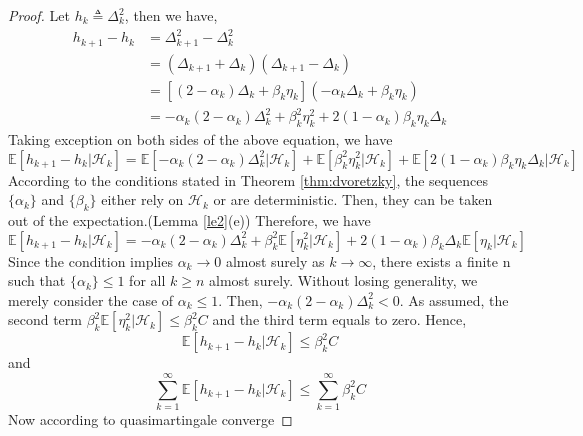   \begin{proof}
    Let $h_{k} \triangleq \Delta_{k}^{2}$, then we have,
    \begin{align*}
      h_{k+1} - h_{k} & = \Delta_{k+1}^{2} - \Delta_{k}^{2}                                                                                     \\
                      & = (\Delta_{k+1}+\Delta_{k})(\Delta_{k+1}-\Delta_{k})                                                                    \\
                      & = \left[(2-\alpha_{k}) \Delta_{k}+\beta_{k} \eta_{k}\right](-\alpha_{k} \Delta_{k}+\beta_{k} \eta_{k})                  \\
                      & = -\alpha_{k}(2-\alpha_{k}) \Delta_{k}^{2} + \beta_{k}^{2} \eta_{k}^{2} + 2(1-\alpha_{k}) \beta_{k} \eta_{k} \Delta_{k}
    \end{align*}
    Taking exception on both sides of the above equation, we have \[\mathbb{E}[h_{k+1} - h_{k}|\mathcal{H}_{k}] =
      \mathbb{E}[-\alpha_{k}(2-\alpha_{k}) \Delta_{k}^{2}|\mathcal{H}_{k}] + \mathbb{E}[\beta_{k}^{2}
        \eta_{k}^{2}|\mathcal{H}_{k}] + \mathbb{E}[2(1-\alpha_{k}) \beta_{k} \eta_{k} \Delta_{k}|\mathcal{H}_{k}] \]
    According to the conditions stated in Theorem \ref{thm:dvoretzky}, the sequences $\{\alpha_{k}\}$ and $\{\beta_{k}\}$
    either rely on $\mathcal{H}_{k}$ or are deterministic. Then, they can be taken out of the expectation.(Lemma
    \ref{le2}(e)) Therefore, we have
    \begin{equation}
      \label{equ:hk}
      \mathbb{E}[h_{k+1} - h_{k}|\mathcal{H}_{k}] = -\alpha_{k}(2-\alpha_{k}) \Delta_{k}^{2} + \beta_{k}^{2}
      \mathbb{E}[\eta_{k}^{2}|\mathcal{H}_{k}] + 2(1-\alpha_{k}) \beta_{k} \Delta_{k}\mathbb{E}[\eta_{k} |\mathcal{H}_{k}]
    \end{equation}
    Since the condition implies $\alpha_{k} \to 0$ almost surely as $k\to \infty$, there exists a finite n such that
    $\{\alpha_{k}\} \le 1$ for all $k\ge n$ almost surely. Without losing generality, we merely consider the case of
    $\alpha_{k} \le 1$. Then, $-\alpha_{k}(2-\alpha_{k}) \Delta_{k}^{2} <0$. As assumed, the second term $\beta_{k}^{2}
      \mathbb{E}[\eta_{k}^{2}|\mathcal{H}_{k}] \le \beta_{k}^{2}C$ and the third term equals to zero. Hence, \[
      \mathbb{E}[h_{k+1} - h_{k}|\mathcal{H}_{k}] \le \beta_{k}^{2}C \] and \[\sum_{k=1}^{\infty}{\mathbb{E}[h_{k+1} -
        h_{k}|\mathcal{H}_{k}]} \le \sum_{k=1}^{\infty}{\beta_{k}^{2}C}\] Now according to quasimartingale converge

\end{proof}
